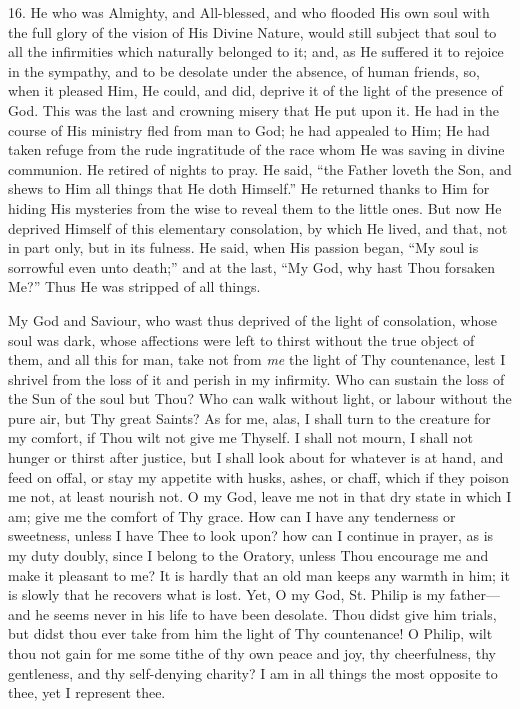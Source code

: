 16. He who was Almighty, and
All-blessed, and who flooded His own soul with the full glory of the
vision of His Divine Nature, would still subject that soul to all the
infirmities which naturally belonged to it; and, as He suffered it to
rejoice in the sympathy, and to be desolate under the absence, of human
friends, so, when it pleased Him, He could, and did, deprive it of the
light of the presence of God. This was the last and crowning misery that
He put upon it. He had in the course of His ministry fled from man to
God; he had appealed to Him; He had taken refuge from the rude
ingratitude of the race whom He was saving in divine communion. He
retired of nights to pray. He said, ``the Father loveth the Son, and
shews to Him all things that He doth Himself.'' He returned thanks to Him
for hiding His mysteries from the wise to reveal them to the little
ones. But now He deprived Himself of this elementary consolation, by
which He lived, and that, not in part only, but in its fulness. He said,
when His passion began, ``My soul is sorrowful even unto death;'' and at
the last, ``My God, why hast Thou forsaken Me?'' Thus He was stripped of
all things.

My God and Saviour, who wast
thus deprived of the light of consolation, whose soul was dark, whose
affections were left to thirst without the true object of them, and all
this for man, take not from \emph{me} the light of Thy countenance, lest
I shrivel from the loss of it and perish in my infirmity. Who can
sustain the loss of the Sun of the soul but Thou? Who can walk without
light, or labour without the pure air, but Thy great Saints? As for me,
alas, I shall turn to the creature for my comfort, if Thou wilt not give
me Thyself. I shall not mourn, I shall not hunger or thirst after
justice, but I shall look about for whatever is at hand, and feed on
offal, or stay my appetite with husks, ashes, or chaff, which if they
poison me not, at least nourish not. O my God, leave me not in that dry
state in which I am; give me the comfort of Thy grace. How can I have
any tenderness or sweetness, unless I have Thee to look upon? how can I
continue in prayer, as is my duty doubly, since I belong to the Oratory,
unless Thou encourage me and make it pleasant to me? It is hardly that
an old man keeps any warmth in him; it is slowly that he recovers
what is lost. Yet, O my God, St. Philip is my father—and he seems
never in his life to have been desolate. Thou didst give him trials, but
didst thou ever take from him the light of Thy countenance! O Philip,
wilt thou not gain for me some tithe of thy own peace and joy, thy
cheerfulness, thy gentleness, and thy self-denying charity? I am in all
things the most opposite to thee, yet I represent thee.

